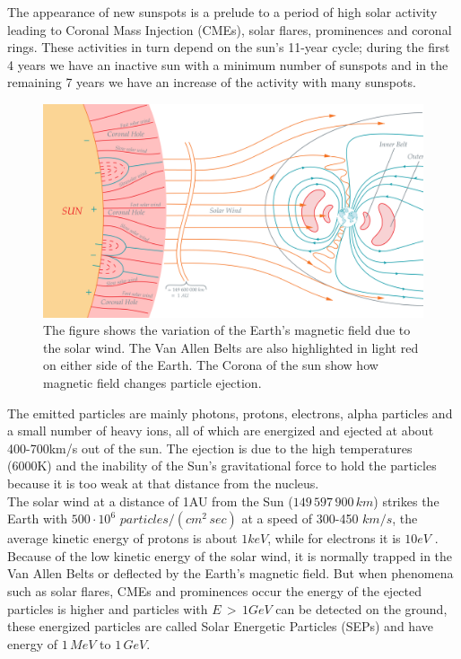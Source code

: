 {{{{{					The appearance of new sunspots is a prelude to a period of high solar activity leading to Coronal Mass Injection (CMEs), solar flares, prominences and coronal rings. These activities in turn depend on the sun's 11-year cycle; during the first 4 years we have an inactive sun with a minimum number of sunspots and in the remaining 7 years we have an increase of the  activity  with many sunspots. 
					\begin{figure}[H]
    					\centering
    					\includegraphics[width=\textwidth,center]{./images/Magnetosfera_e_raggi_solari_coronalHole.png}
    					\caption{The figure shows the variation of the Earth's magnetic field due to the solar wind. The Van Allen Belts are also highlighted in light red on either side of the Earth. The Corona of the sun show how magnetic field changes particle ejection.}
    					\label{fig:MagnetosphereVanAllenBelts}
					\end{figure} 
				
					The emitted particles are mainly photons, protons, electrons, alpha particles and a small number of heavy ions, all of which are energized and ejected at about 400-700km/s out of the sun. The ejection is due to the high temperatures (6000K) and the inability of the Sun's gravitational force to hold the particles because it is too weak at that distance from the nucleus. \\
					
					The solar wind at a distance of 1AU from the Sun  ($149\,597\,900\,km$) strikes the Earth with $500\cdot 10^6\,\, particles/(cm^2\,sec)$ at a speed of 300-450$\,\,km/s$, the average kinetic energy of protons is about $1keV$, while for electrons it is $10eV$ . Because of the low kinetic energy of the solar wind, it is normally trapped in the Van Allen Belts or deflected by the Earth's magnetic field. But when phenomena such as solar flares, CMEs and prominences occur the energy of the ejected particles is higher and particles with $E\,>\,1GeV$ can be detected on the ground, these energized particles are called Solar Energetic Particles (SEPs) and have energy of $1\,MeV$ to $1\,GeV$.\\
					
}}}}}
